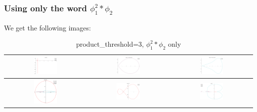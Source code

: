 \documentclass[a4paper,10pt]{article}
\begin{document}
 \subsubsection{Using only the word $\phi_1^2*\phi_2$}
 We get the following images:
 \begin{table}[!ht]
 \caption{product\_threshold=3, $\phi_1^2*\phi_2$ only}
 \begin{tabular}{|c|c|c|}
  \hline
  \includegraphics[width=0.3\textwidth]{PT_3_z1_1-2_2-1.png} &
  \includegraphics[width=0.3\textwidth]{PT_3_C1z1_1-2_2-1.png} &
  \includegraphics[width=0.3\textwidth]{PT_3_C2z1_1-2_2-1.png} \\ \hline
  \includegraphics[width=0.3\textwidth]{PT_3_z2_1-2_2-1.png} &
  \includegraphics[width=0.3\textwidth]{PT_3_zed_C0_1-2_2-1.png} &
  \includegraphics[width=0.3\textwidth]{PT_3_zed_1-2_2-1.png} \\ \hline
 \end{tabular}
 \end{table}
 
\end{document}
